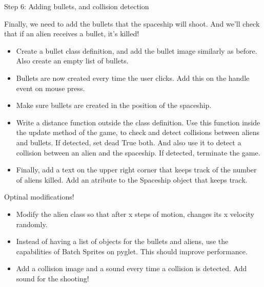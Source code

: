\documentclass[10pt]{beamer}
\begin{document}
\begin{frame}{Step 6: Adding bullets, and collision detection}

Finally, we need to add the bullets that the spaceship will shoot. And we'll check that if an alien receives a bullet, it's killed!

\begin{itemize}

\item Create a bullet class definition, and add the bullet image similarly as before. Also create an empty list of bullets.

\item Bullets are now created every time the user clicks. Add this on the handle event on mouse press.

\item Make sure bullets are created in the position of the spaceship. 

\item Write a distance function outside the class definition. Use this function inside the update method of the game, to check and detect collisions between aliens and bullets. If detected, set dead True both. And also use it to detect a collision between an alien and the spaceship. If detected, terminate the game.

\item Finally, add a text on the upper right corner that keeps track of the number of aliens killed. Add an atribute to the Spaceship object that keeps track.

\end{itemize}

\end{frame}

\begin{frame}{Optinal modifications!}

\begin{itemize}

\item Modify the alien class so that after x steps of motion, changes its x velocity randomly.

\item Instead of having a list of objects for the bullets and aliens, use the capabilities of Batch Sprites on pyglet. This should improve performance.

\item Add a collision image and a sound every time a collision is detected. Add sound for the shooting!


\end{itemize}
\end{frame}
\end{document}
